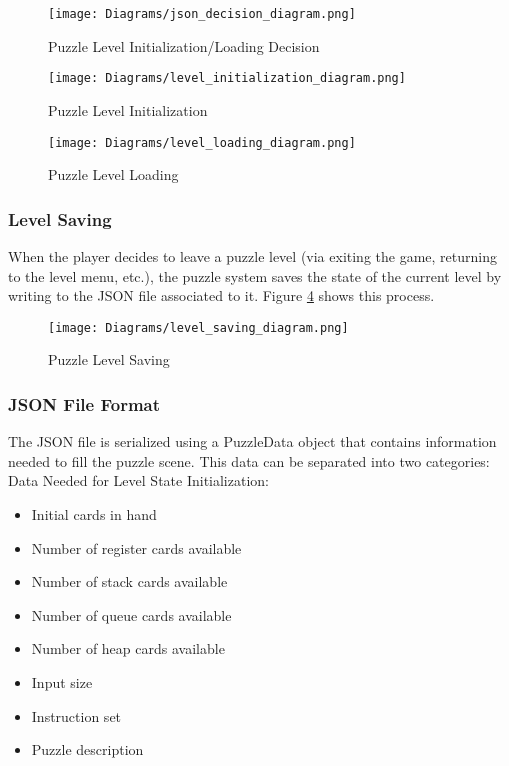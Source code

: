 \begin{figure}[!hb]
  \caption{Puzzle Level Initialization/Loading Decision}
  \label{fig:json_decision_diagram}
  \centering
  \texttt{[image: Diagrams/json\_decision\_diagram.png]}
\end{figure}
\vfill
\clearpage

\begin{figure}[!t]
  \caption{Puzzle Level Initialization}
  \label{fig:level_initialization_diagram}
  \centering
  \texttt{[image: Diagrams/level\_initialization\_diagram.png]}
\end{figure}

\begin{figure}[!b]
  \caption{Puzzle Level Loading}
  \label{fig:level_loading_diagram}
  \centering
  \texttt{[image: Diagrams/level\_loading\_diagram.png]}
\end{figure}
\vfill
\clearpage

\subsubsection{Level Saving}
When the player decides to leave a puzzle level (via exiting the game, returning to the
level menu, etc.), the puzzle system saves the state of the current level by writing
to the JSON file associated to it. Figure \ref{fig:level_saving_diagram} shows this process.

\begin{figure}[!hb]
  \caption{Puzzle Level Saving}
  \label{fig:level_saving_diagram}
  \centering
  \texttt{[image: Diagrams/level\_saving\_diagram.png]}
\end{figure}

\subsubsection{JSON File Format}
The JSON file is serialized using a PuzzleData object that contains information
needed to fill the puzzle scene. This data can be separated into two categories:\\

Data Needed for Level State Initialization:
\begin{itemize}
  \item Initial cards in hand
  \item Number of register cards available
  \item Number of stack cards available
  \item Number of queue cards available
  \item Number of heap cards available
  \item Input size
  \item Instruction set
  \item Puzzle description
\end{itemize}

